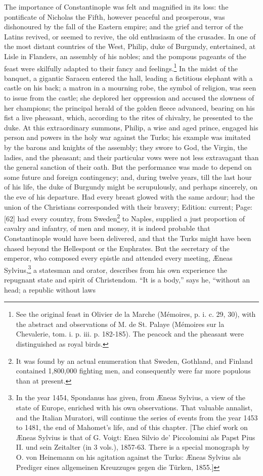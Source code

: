 The importance of Constantinople was felt and magnified in its loss: the pontificate of Nicholas the Fifth, however peaceful and prosperous, was dishonoured by the fall of the Eastern empire; and the grief and terror of the Latins revived, or seemed to revive, the old enthusiasm of the crusades. In one of the most distant countries of the West, Philip, duke of Burgundy, entertained, at Lisle in Flanders, an assembly of his nobles; and the pompous pageants of the feast were skilfully adapted to their fancy and feelings.\footnote{See the original feast in Olivier de la Marche (Mémoires, p. i. c. 29, 30), with the abstract and observations of M. de St. Palaye (Mémoires sur la Chevalerie, tom. i. p. iii. p. 182-185). The peacock and the pheasant were distinguished as royal birds.} In the midst of the banquet, a gigantic Saracen entered the hall, leading a fictitious elephant with a castle on his back; a matron in a mourning robe, the symbol of religion, was seen to issue from the castle; she deplored her oppression and accused the slowness of her champions; the principal herald of the golden fleece advanced, bearing on his fist a live pheasant, which, according to the rites of chivalry, he presented to the duke. At this extraordinary summons, Philip, a wise and aged prince, engaged his person and powers in the holy war against the Turks; his example was imitated by the barons and knights of the assembly; they swore to God, the Virgin, the ladies, and the pheasant; and their particular vows were not less extravagant than the general sanction of their oath. But the performance was made to depend on some future and foreign contingency; and, during twelve years, till the last hour of his life, the duke of Burgundy might be scrupulously, and perhaps sincerely, on the eve of his departure. Had every breast glowed with the same ardour; had the union of the Christians corresponded with their bravery; Edition: current; Page: [62] had every country, from Sweden\footnote{It was found by an actual enumeration that Sweden, Gothland, and Finland contained 1,800,000 fighting men, and consequently were far more populous than at present.} to Naples, supplied a just proportion of cavalry and infantry, of men and money, it is indeed probable that Constantinople would have been delivered, and that the Turks might have been chased beyond the Hellespont or the Euphrates. But the secretary of the emperor, who composed every epistle and attended every meeting, Æneas Sylvius,\footnote{In the year 1454, Spondanus has given, from Æneas Sylvius, a view of the state of Europe, enriched with his own observations. That valuable annalist, and the Italian Muratori, will continue the series of events from the year 1453 to 1481, the end of Mahomet\texthebrew{}’s life, and of this chapter. [The chief work on Æneas Sylvius is that of G. Voigt: Enea Silvio de\texthebrew{}’ Piccolomini als Papst Pius II. und sein Zeitalter (in 3 vols.), 1857-63. There is a special monograph by O. von Heinemann on his agitation against the Turks: Æneas Sylvius als Prediger eines allgemeinen Kreuzzuges gegen die Türken, 1855.]} a statesman and orator, describes from his own experience the repugnant state and spirit of Christendom. \texthebrew{“}It is a body,\texthebrew{}” says he, \texthebrew{“}without an head; a republic without laws 